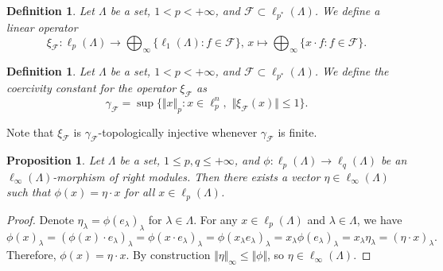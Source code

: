 \documentclass[12pt]{article}
\newtheorem{proposition}[theorem]{Proposition}
\newtheorem{definition}[theorem]{Definition}
\begin{document}
\begin{definition}\label{StdEmbd} 
    Let $\Lambda$ be a set, $1<p<+\infty$, 
    and $\mathcal{F}\subset\ell_{p^*}(\Lambda)$. We define a linear operator
    \[
        \xi_{\mathcal{F}}: 
        \ell_p(\Lambda)\to\bigoplus_\infty\{\ell_1(\Lambda):f\in\mathcal{F}\},\,
        x \mapsto \bigoplus_\infty\{ x\cdot f: f\in\mathcal{F}\}.
    \]
\end{definition}

\begin{definition}\label{StdEmbdCoercv}
    Let $\Lambda$ be a set, $1<p<+\infty$, 
    and $\mathcal{F}\subset \ell_{p^*}(\Lambda)$. We define the coercivity 
    constant for the operator $\xi_{\mathcal{F}}$ as
    \[
        \gamma_{\mathcal{F}}=\sup\{
            \Vert x\Vert_p: 
            x\in\ell_p^n,\,\, \Vert \xi_{\mathcal{F}}(x)\Vert\leq 1
        \}.
    \]
\end{definition}

Note that $\xi_{\mathcal{F}}$ is $\gamma_{\mathcal{F}}$-topologically injective 
whenever $\gamma_{\mathcal{F}}$ is finite.

\begin{proposition}\label{LinfnMorphlpntolqnCharac}
    Let $\Lambda$ be a set, $1\leq p,q\leq +\infty$, 
    and $\phi:\ell_p(\Lambda)\to \ell_{q}(\Lambda)$ be 
    an $\ell_\infty(\Lambda)$-morphism of right modules. Then there exists a 
    vector $\eta\in\ell_\infty(\Lambda)$ such that $\phi(x)=\eta\cdot x$ 
    for all $x\in \ell_p(\Lambda)$.
\end{proposition}
\begin{proof}
    Denote $\eta_\lambda=\phi(e_\lambda)_\lambda$ for $\lambda\in\Lambda$. 
    For any $x\in\ell_p(\Lambda)$ and $\lambda\in\Lambda$, we have
    \[
        \phi(x)_\lambda
        =(\phi(x)\cdot e_\lambda)_\lambda
        =\phi(x\cdot e_\lambda)_\lambda
        =\phi(x_\lambda e_\lambda)_\lambda
        =x_\lambda\phi(e_\lambda)_\lambda
        =x_\lambda\eta_\lambda
        =(\eta\cdot x)_\lambda.
    \]
    Therefore, $\phi(x)=\eta\cdot x$. By 
    construction $\Vert\eta\Vert_\infty\leq\Vert\phi\Vert$, 
    so $\eta\in\ell_\infty(\Lambda)$.
\end{proof}
\end{document}
